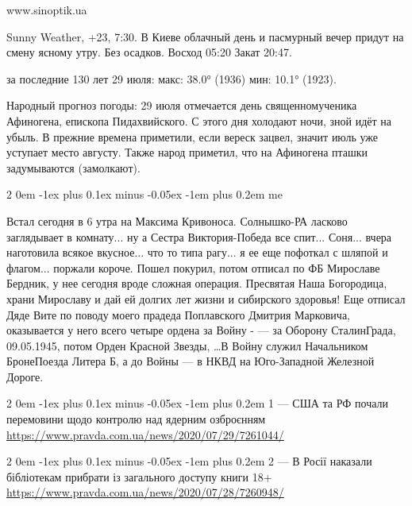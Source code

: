 \documentclass[a4paper,11pt]{extreport}
\makeatletter
\renewcommand\subsection{%
  \clearpage
    \@startsection{subsection}%
    {2}%
    {0em}%
    {-1ex plus 0.1ex minus -0.05ex}%
    {-1em plus 0.2em}%
    {\scshape\bfseries\Large}%
}
\makeatother
\begin{document}

www.sinoptik.ua

Sunny Weather, +23, 7:30. В Киеве облачный день и пасмурный вечер придут на
смену ясному утру. Без осадков. Восход 05:20 Закат 20:47.

за последние 130 лет 29 июля: макс: 38.0° (1936) мин: 10.1° (1923).

Народный прогноз погоды: 29 июля отмечается день священномученика Афиногена,
епископа Пидахвийского. С этого дня холодают ночи, зной идёт на убыль. В
прежние времена приметили, если вереск зацвел, значит июль уже уступает место
августу. Также народ приметил, что на Афиногена пташки задумываются
(замолкают).

 
 

\subsection{me}
\label{sec:29_07_2020.me}

Встал сегодня в 6 утра на Максима Кривоноса. Солнышко-РА ласково заглядывает в комнату... ну а Сестра Виктория-Победа все спит... Соня... вчера
наготовила всякое вкусное...  что то типа рагу... я ее еще пофоткал с шляпой и
флагом... поржали короче.  Пошел покурил, потом отписал по ФБ Мирославе
Бердник, у нее сегодня вроде сложная операция. Пресвятая Наша Богородица, храни
Мирославу и дай ей долгих лет жизни и сибирского здоровья! Еще отписал Дяде
Вите по поводу моего прадеда Поплавского Дмитрия Марковича, оказывается у него
всего четыре ордена за Войну - --- за Оборону СталинГрада, 09.05.1945, потом
Орден Красной Звезды, \ldots В Войну служил Начальником БронеПоезда Литера Б, а
до Войны --- в НКВД на Юго-Западной Железной Дороге.


 


\subsection{1 --- США та РФ почали перемовини щодо контролю над ядерним озброєнням}
\url{https://www.pravda.com.ua/news/2020/07/29/7261044/}

\subsection{2 --- В Росії наказали бібліотекам прибрати із загального доступу книги 18+}
\url{https://www.pravda.com.ua/news/2020/07/28/7260948/}
\end{document}
